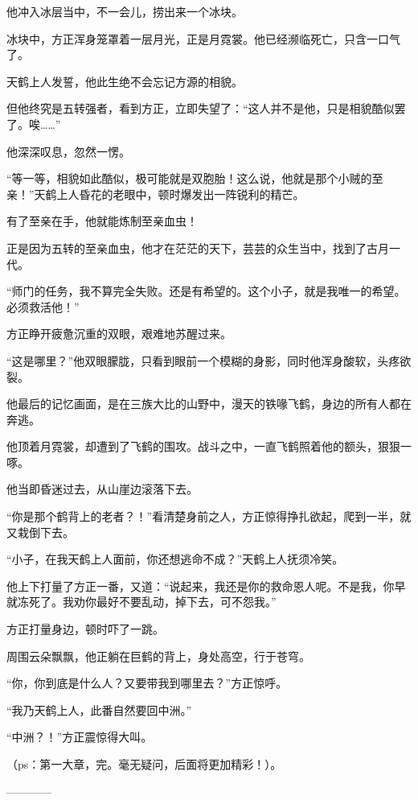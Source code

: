 \begin{this_body}
他冲入冰层当中，不一会儿，捞出来一个冰块。

冰块中，方正浑身笼罩着一层月光，正是月霓裳。他已经濒临死亡，只含一口气了。

天鹤上人发誓，他此生绝不会忘记方源的相貌。

但他终究是五转强者，看到方正，立即失望了：“这人并不是他，只是相貌酷似罢了。唉……”

他深深叹息，忽然一愣。

“等一等，相貌如此酷似，极可能就是双胞胎！这么说，他就是那个小贼的至亲！”天鹤上人昏花的老眼中，顿时爆发出一阵锐利的精芒。

有了至亲在手，他就能炼制至亲血虫！

正是因为五转的至亲血虫，他才在茫茫的天下，芸芸的众生当中，找到了古月一代。

“师门的任务，我不算完全失败。还是有希望的。这个小子，就是我唯一的希望。必须救活他！”

方正睁开疲惫沉重的双眼，艰难地苏醒过来。

“这是哪里？”他双眼朦胧，只看到眼前一个模糊的身影，同时他浑身酸软，头疼欲裂。

他最后的记忆画面，是在三族大比的山野中，漫天的铁喙飞鹤，身边的所有人都在奔逃。

他顶着月霓裳，却遭到了飞鹤的围攻。战斗之中，一直飞鹤照着他的额头，狠狠一啄。

他当即昏迷过去，从山崖边滚落下去。

“你是那个鹤背上的老者？！”看清楚身前之人，方正惊得挣扎欲起，爬到一半，就又栽倒下去。

“小子，在我天鹤上人面前，你还想逃命不成？”天鹤上人抚须冷笑。

他上下打量了方正一番，又道：“说起来，我还是你的救命恩人呢。不是我，你早就冻死了。我劝你最好不要乱动，掉下去，可不怨我。”

方正打量身边，顿时吓了一跳。

周围云朵飘飘，他正躺在巨鹤的背上，身处高空，行于苍穹。

“你，你到底是什么人？又要带我到哪里去？”方正惊呼。

“我乃天鹤上人，此番自然要回中洲。”

“中洲？！”方正震惊得大叫。

（ps：第一大章，完。毫无疑问，后面将更加精彩！）。

------------

\end{this_body}

